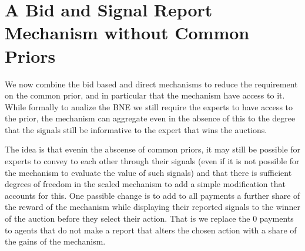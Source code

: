 







\section{A Bid and Signal Report Mechanism without Common Priors}

We now combine the bid based and direct mechanisms to reduce the requirement on the common prior, and in particular that the mechanism have access to it. While formally to analize the BNE we still require the experts to have access to the prior, the mechanism can aggregate even in the absence of this to the degree that the signals still be informative to the expert that wins the auctions. 

The idea is that evenin the abscense of common priors, it may still be possible for experts to convey to each other through their signals (even if it is not possible for the mechanism to evaluate the value of such signals) and that there is sufficient degrees of freedom in the scaled mechanism to add a simple modification that accounts for this.
One passible change is to add to all payments a further share of the reward of the mechanism while displaying their reported signals to the winner of the auction before they select their action. That is we replace the 0 payments to agents that do not make a report that alters the chosen action with a  share of the gains of the mechanism.

